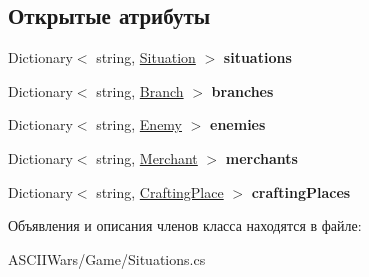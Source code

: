 \subsection*{Открытые атрибуты}
\begin{DoxyCompactItemize}
\item 
\hypertarget{class_a_s_c_i_i_wars_1_1_game_1_1_situation_container_a24a982285b5782ecee43e98205d056c1}{}\label{class_a_s_c_i_i_wars_1_1_game_1_1_situation_container_a24a982285b5782ecee43e98205d056c1} 
Dictionary$<$ string, \hyperlink{class_a_s_c_i_i_wars_1_1_game_1_1_situation}{Situation} $>$ {\bfseries situations}
\item 
\hypertarget{class_a_s_c_i_i_wars_1_1_game_1_1_situation_container_af99ccf46ddcb93df3aa8ca830be1d2cd}{}\label{class_a_s_c_i_i_wars_1_1_game_1_1_situation_container_af99ccf46ddcb93df3aa8ca830be1d2cd} 
Dictionary$<$ string, \hyperlink{class_a_s_c_i_i_wars_1_1_game_1_1_branch}{Branch} $>$ {\bfseries branches}
\item 
\hypertarget{class_a_s_c_i_i_wars_1_1_game_1_1_situation_container_ae83c07e8b05da394daebe44f00e4f4d2}{}\label{class_a_s_c_i_i_wars_1_1_game_1_1_situation_container_ae83c07e8b05da394daebe44f00e4f4d2} 
Dictionary$<$ string, \hyperlink{class_a_s_c_i_i_wars_1_1_game_1_1_enemy}{Enemy} $>$ {\bfseries enemies}
\item 
\hypertarget{class_a_s_c_i_i_wars_1_1_game_1_1_situation_container_ad941813542c7012bd5867cc7962f1fee}{}\label{class_a_s_c_i_i_wars_1_1_game_1_1_situation_container_ad941813542c7012bd5867cc7962f1fee} 
Dictionary$<$ string, \hyperlink{class_a_s_c_i_i_wars_1_1_game_1_1_merchant}{Merchant} $>$ {\bfseries merchants}
\item 
\hypertarget{class_a_s_c_i_i_wars_1_1_game_1_1_situation_container_a289c9b8afd2b2d3561f850e4ce6a4e0b}{}\label{class_a_s_c_i_i_wars_1_1_game_1_1_situation_container_a289c9b8afd2b2d3561f850e4ce6a4e0b} 
Dictionary$<$ string, \hyperlink{class_a_s_c_i_i_wars_1_1_game_1_1_crafting_place}{Crafting\+Place} $>$ {\bfseries crafting\+Places}
\end{DoxyCompactItemize}


Объявления и описания членов класса находятся в файле\+:\begin{DoxyCompactItemize}
\item 
A\+S\+C\+I\+I\+Wars/\+Game/Situations.\+cs\end{DoxyCompactItemize}
